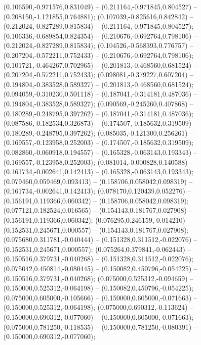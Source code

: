  (0.106590,-0.971576,0.831049) -- (0.211164,-0.971845,0.804527) -- (0.208150,-1.121855,0.764881);
 (0.107039,-0.825616,0.842842) -- (0.212024,-0.827289,0.815834) -- (0.211164,-0.971845,0.804527);
 (0.106336,-0.689854,0.824354) -- (0.210676,-0.692764,0.798106) -- (0.212024,-0.827289,0.815834);
 (0.104526,-0.568393,0.776757) -- (0.207204,-0.572211,0.752433) -- (0.210676,-0.692764,0.798106);
 (0.101721,-0.464267,0.702965) -- (0.201813,-0.468560,0.681524) -- (0.207204,-0.572211,0.752433);
 (0.098081,-0.379227,0.607204) -- (0.194804,-0.383528,0.589327) -- (0.201813,-0.468560,0.681524);
 (0.094059,-0.310230,0.501118) -- (0.187041,-0.314181,0.487036) -- (0.194804,-0.383528,0.589327);
 (0.090569,-0.245260,0.407868) -- (0.180289,-0.248795,0.397262) -- (0.187041,-0.314181,0.487036);
 (0.087586,-0.182534,0.326873) -- (0.174507,-0.185632,0.319509) -- (0.180289,-0.248795,0.397262);
 (0.085035,-0.121300,0.256261) -- (0.169557,-0.123958,0.252003) -- (0.174507,-0.185632,0.319509);
 (0.082860,-0.060918,0.194557) -- (0.165328,-0.063143,0.193343) -- (0.169557,-0.123958,0.252003);
 (0.081014,-0.000828,0.140588) -- (0.161734,-0.002641,0.142413) -- (0.165328,-0.063143,0.193343);
 (0.079460,0.059469,0.093413) -- (0.158706,0.058042,0.098319) -- (0.161734,-0.002641,0.142413);
 (0.078170,0.120439,0.052276) -- (0.156191,0.119366,0.060342) -- (0.158706,0.058042,0.098319);
 (0.077121,0.182524,0.016565) -- (0.154143,0.181767,0.027908) -- (0.156191,0.119366,0.060342);
 (0.076295,0.246159,-0.014210) -- (0.152531,0.245671,0.000557) -- (0.154143,0.181767,0.027908);
 (0.075680,0.311781,-0.040444) -- (0.151328,0.311512,-0.022076) -- (0.152531,0.245671,0.000557);
 (0.075264,0.379841,-0.062443) -- (0.150516,0.379731,-0.040268) -- (0.151328,0.311512,-0.022076);
 (0.075042,0.450814,-0.080445) -- (0.150082,0.450796,-0.054225) -- (0.150516,0.379731,-0.040268);
 (0.075000,0.525312,-0.094659) -- (0.150000,0.525312,-0.064198) -- (0.150082,0.450796,-0.054225);
 (0.075000,0.605000,-0.105666) -- (0.150000,0.605000,-0.071663) -- (0.150000,0.525312,-0.064198);
 (0.075000,0.690312,-0.113624) -- (0.150000,0.690312,-0.077060) -- (0.150000,0.605000,-0.071663);
 (0.075000,0.781250,-0.118535) -- (0.150000,0.781250,-0.080391) -- (0.150000,0.690312,-0.077060);
